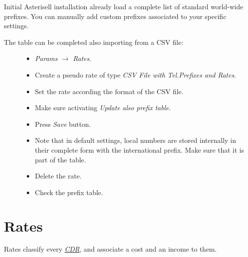 \documentclass[letterpaper,10pt,english]{sphinxmanual}
\begin{document}
Initial Asterisell installation already load a complete list of standard world-wide prefixes. You can manually add custom prefixes associated to your specific settings.
\begin{description}
\item[{The table can be completed also importing from a CSV file:}] \leavevmode\begin{itemize}
\item {} 
\emph{Params \(\rightarrow\) Rates}.

\item {} 
Create a pseudo rate of type \emph{CSV File with Tel.Prefixes and Rates}.

\item {} 
Set the rate according the format of the CSV file.

\item {} 
Make sure activating \emph{Update also prefix table}.

\item {} 
Press \emph{Save} button.

\item {} 
Note that in default settings, local numbers are stored internally in their complete form with the international prefix. Make sure that it is part of the table.

\item {} 
Delete the rate.

\item {} 
Check the prefix table.

\end{itemize}

\end{description}


\section{Rates}
\label{index:cdr-rating-process}\label{index:rates}
Rates classify every {\hyperref[index:term-cdr]{\emph{CDR}}}, and associate a cost and an income to them.
\end{document}
